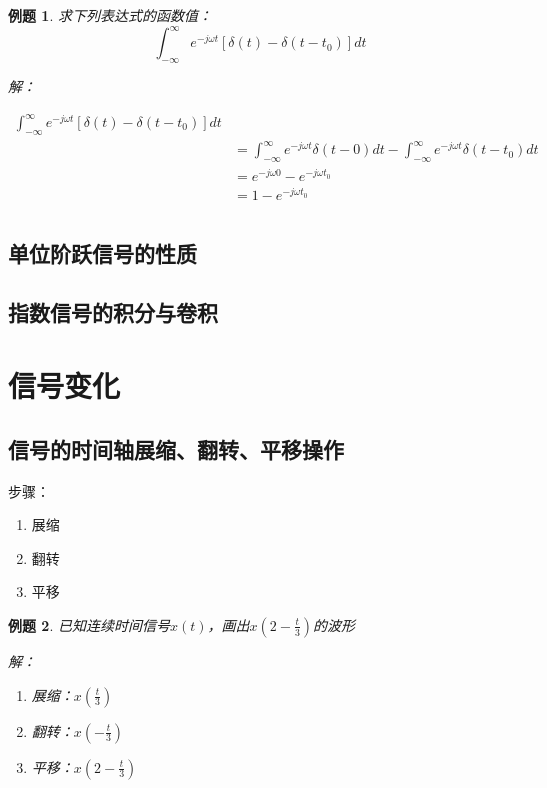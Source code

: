 \documentclass[UTF8]{ctexart}
\newtheorem{example}{例题}[section]
\begin{document}
    \begin{tcolorbox}[blue]
        \begin{example}
            求下列表达式的函数值：
            $$\int_{-\infty}^{\infty} e^{-j\omega t} [\delta (t) - \delta (t-t_0)] dt$$

            解：

            \begin{equation*}
                \begin{aligned}
                     \int_{-\infty}^{\infty} e^{-j\omega t} [\delta (t) - \delta (t-t_0)] dt\\
                    &= \int_{-\infty}^{\infty} e^{-j\omega t}\delta (t-0) dt - \int_{-\infty}^{\infty} e^{-j\omega t}\delta (t-t_0) dt\\
                    &= e^{-j\omega 0} - e^{-j\omega t_0}\\
                    &= 1 - e^{-j\omega t_0}\\
                \end{aligned}
            \end{equation*}
        \end{example}
    \end{tcolorbox}

    \subsection{单位阶跃信号的性质}

    \subsection{指数信号的积分与卷积}

    \section{信号变化}

    \subsection{信号的时间轴展缩、翻转、平移操作}
    步骤：
    \begin{enumerate}
        \item 展缩
        \item 翻转
        \item 平移
    \end{enumerate}

    \begin{tcolorbox}[blue]
        \begin{example}
            已知连续时间信号$x(t)$，画出$x(2-\frac{t}{3})$的波形

            解：
            \begin{enumerate}
                \item 展缩：$x(\frac{t}{3})$
                \item 翻转：$x(-\frac{t}{3})$
                \item 平移：$x(2-\frac{t}{3})$
            \end{enumerate}
        \end{example}
    \end{tcolorbox}
\end{document}
